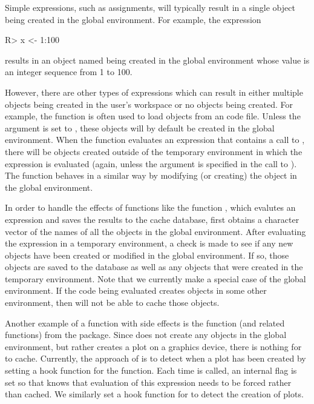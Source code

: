 \documentclass[nojss]{jss}
\begin{document}
Simple expressions, such as assignments, will typically result in a
single object being created in the global environment.  For example,
the expression
\begin{Schunk}
\begin{Sinput}
R> x <- 1:100
\end{Sinput}
\end{Schunk}
results in an object named  being created in the global
environment whose value is an integer sequence from 1 to 100.

However, there are other types of expressions which can result in
either multiple objects being created in the user's workspace or no
objects being created.  For example, the  function is
often used to load objects from an  code file.  Unless the
 argument is set to , these objects will by
default be created in the global environment.  When the 
function evaluates an expression that contains a call to
, there will be objects created outside of the temporary
environment in which the expression is evaluated (again, unless the
argument  is specified in the call to
).  The  function behaves in a similar way
by modifying (or creating) the  object in the
global environment.

In order to handle the effects of functions like  the
function , which evalutes an expression and saves
the results to the cache database, first obtains a character vector of
the names of all the objects in the global environment.  After
evaluating the expression in a temporary environment, a check is made
to see if any new objects have been created or modified in the global
environment.  If so, those objects are saved to the database as well
as any objects that were created in the temporary environment.  Note
that we currently make a special case of the global environment.  If
the code being evaluated creates objects in some other environment,
then  will not be able to cache those objects.

Another example of a function with side effects is the 
function (and related functions) from the  package.
Since  does not create any objects in the global
environment, but rather creates a plot on a graphics device, there is
nothing for  to cache.  Currently, the approach of
 is to detect when a plot has been created by setting a
hook function for the  function.  Each time
 is called, an internal flag is set so that
 knows that evaluation of this expression needs to be
forced rather than cached.  We similarly set a hook function for
 to detect the creation of  plots.
\end{document}
